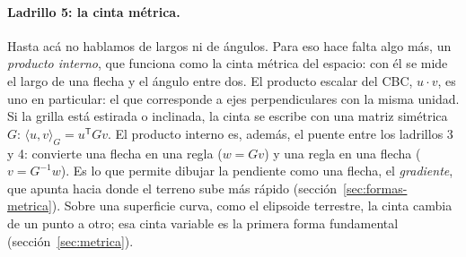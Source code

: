 \paragraph{Ladrillo 5: la cinta métrica.}
Hasta acá no hablamos de largos ni de ángulos. Para eso hace falta algo más, un
\emph{producto interno}, que funciona como la cinta métrica del espacio: con él se mide el largo
de una flecha y el ángulo entre dos. El producto escalar del CBC, \(u\cdot v\), es uno en
particular: el que corresponde a ejes perpendiculares con la misma unidad. Si la grilla está
estirada o inclinada, la cinta se escribe con una matriz simétrica \(G\):
\(\langle u,v\rangle_G=u^{\mathsf T}Gv\). El producto interno es, además, el puente entre los
ladrillos 3 y 4: convierte una flecha en una regla (\(w=Gv\)) y una regla en una flecha
(\(v=G^{-1}w\)). Es lo que permite dibujar la pendiente como una flecha, el \emph{gradiente},
que apunta hacia donde el terreno sube más rápido (sección~\ref{sec:formas-metrica}). Sobre una
superficie curva, como el elipsoide terrestre, la cinta cambia de un punto a otro; esa cinta
variable es la primera forma fundamental (sección~\ref{sec:metrica}).

